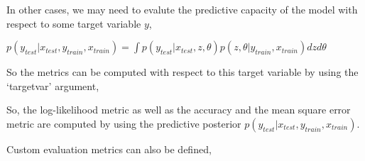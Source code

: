 \documentclass[letterpaper,10pt,english]{sphinxmanual}
\begin{document}
In other cases, we may need to evalute the predictive capacity of the
model with respect to some target variable \(y\),

\(p(y_{test}|x_{test}, y_{train}, x_{train}) = \int p(y_{test}|x_{test},z,\theta)p(z,\theta|y_{train}, x_{train}) dzd\theta\)

So the metrics can be computed with respect to this target variable by
using the ‘targetvar’ argument,

\begin{sphinxVerbatim}[commandchars=\\\{\}]
          \PYG{p}{[}  \PYG{p}{]}
\end{sphinxVerbatim}

So, the log-likelihood metric as well as the accuracy and the mean
square error metric are computed by using the predictive posterior
\(p(y_{test}|x_{test}, y_{train}, x_{train})\).

Custom evaluation metrics can also be defined,

\begin{sphinxVerbatim}[commandchars=\\\{\}]
   
          
       

         \PYG{p}{[} \PYG{p}{]}
\end{sphinxVerbatim}
\end{document}
